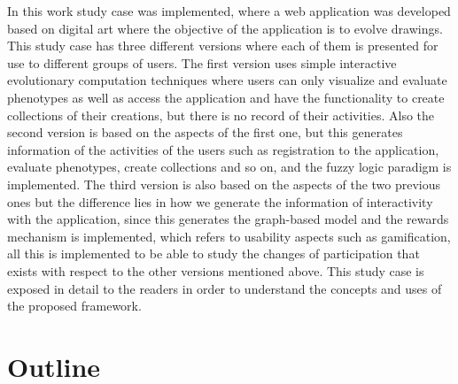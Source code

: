 \par In this work study case  was implemented, where a web application was
developed based on digital art where the objective of the application is to
evolve drawings. This study case has three different versions where each of them
is presented for use to different groups of users. The first version uses simple
interactive evolutionary computation techniques where users can only visualize
and evaluate phenotypes as well as access the application and have the
functionality to create collections of their creations, but there is no record
of their activities. Also the second version is based on the aspects of the
first one, but this generates information of the activities of the users such as
registration to the application, evaluate phenotypes, create collections and so
on, and the fuzzy logic paradigm is implemented.  The third version is also
based on the aspects of the two previous ones but the difference lies in how we
generate the information of interactivity with the application, since this
generates the graph-based model and the rewards mechanism is implemented, which
refers to usability aspects such as gamification, all this is implemented to be
able to study the changes of participation that exists with respect to the other
versions mentioned above. This study case is exposed in detail to the readers in
order to understand the concepts and uses of the proposed framework.

\section{Outline}

